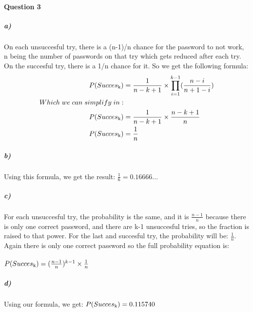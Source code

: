 \documentclass{article}
\begin{document}
\paragraph{Question 3}
\subparagraph{a)}
On each unsuccesful try, there is a (n-1)/n chance for the password to not work, n being the number of passwords on that try which gets reduced after each try. On the succesful try, there is a 1/n chance for it. So we get the following formula:
\begin{equation*}
\begin{split}
P(Succes\textsubscript k) & =\frac{1}{n-k+1}\times\prod_{i = 1}^{k-1}(\frac{n-i}{n+1-i}) \\
Which\;we\;can\;simplify\;in: \\
P(Succes\textsubscript k) & =\frac{1}{n-k+1}\times\frac{n-k+1}{n} \\
P(Succes\textsubscript k) & =\frac{1}{n}
\end{split}
\end{equation*}
\subparagraph{b)}
Using this formula, we get the result: $\frac{1}{6} = 0.16666...$
\subparagraph{c)}
For each unsuccesful try, the probability is the same, and it is $\frac{n-1}{n}$ because there is only one correct password, and there are k-1 unsuccesful tries, so the fraction is raised to that power. For the last and succesful try, the probability will be: $\frac{1}{n}$. Again there is only one correct password so the full probability equation is:\\ \\
$P(Succes\textsubscript k) =(\frac{n-1}{n})^{k-1} \times\frac{1}{n}$
\subparagraph{d)}
Using our formula, we get: $P(Succes\textsubscript k) = 0.115740$
\pagebreak
\end{document}
